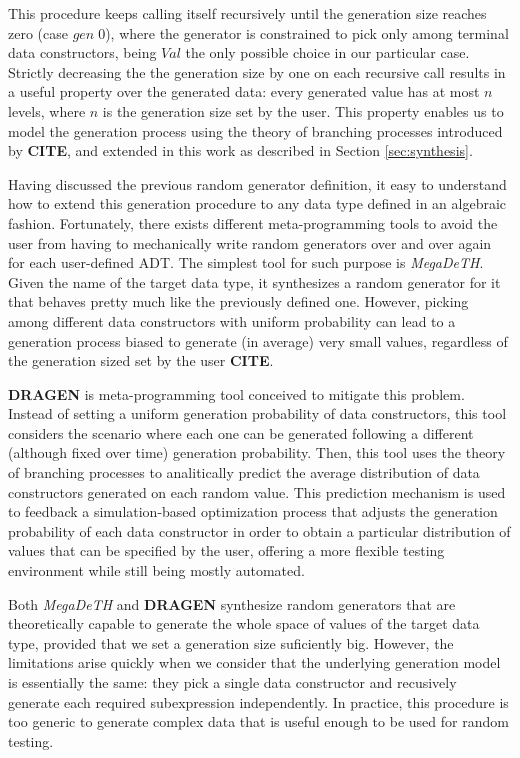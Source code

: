 \documentclass[conference, fleqn]{IEEEtran}
\newcommand{\Conid}[1]{\mathit{#1}}
\newcommand{\Varid}[1]{\mathit{#1}}
\newcommand{\tocite}{\textbf{CITE}}
\newcommand{\megadeth}{\emph{MegaDeTH}\xspace}
\newcommand{\dragen}{\textbf{DRAGEN}\xspace}
\begin{document}
This procedure keeps calling itself recursively until the generation size
reaches zero (case \ensuremath{\Varid{gen}\;\mathrm{0}}), where the generator is constrained to pick only
among terminal data constructors, being \ensuremath{\Conid{Val}} the only possible choice in our
particular case.
%
Strictly decreasing the the generation size by one on each recursive call
results in a useful property over the generated data: every generated value has
at most \ensuremath{\Varid{n}} levels, where \ensuremath{\Varid{n}} is the generation size set by the user.
%
This property enables us to model the generation process using the theory of
branching processes introduced by \tocite, and extended in this work as
described in Section \ref{sec:synthesis}.


Having discussed the previous random generator definition, it easy to understand
how to extend this generation procedure to any data type defined in an algebraic
fashion.
%
Fortunately, there exists different meta-programming tools to avoid the user
from having to mechanically write random generators over and over again for each
user-defined ADT.
%
The simplest tool for such purpose is \megadeth.
%
Given the name of the target data type, it synthesizes a random generator for it
that behaves pretty much like the previously defined one.
%
However, picking among different data constructors with uniform probability can
lead to a generation process biased to generate (in average) very small values,
regardless of the generation sized set by the user \tocite.

\dragen is meta-programming tool conceived to mitigate this problem.
%
Instead of setting a uniform generation probability of data constructors, this
tool considers the scenario where each one can be generated following a
different (although fixed over time) generation probability.
%
Then, this tool uses the theory of branching processes to analitically predict
the average distribution of data constructors generated on each random value.
%
This prediction mechanism is used to feedback a simulation-based optimization
process that adjusts the generation probability of each data constructor in
order to obtain a particular distribution of values that can be specified by the
user, offering a more flexible testing environment while still being mostly
automated.


Both \megadeth and \dragen synthesize random generators that are theoretically
capable to generate the whole space of values of the target data type, provided
that we set a generation size suficiently big.
%
However, the limitations arise quickly when we consider that the underlying
generation model is essentially the same: they pick a single data constructor
and recusively generate each required subexpression independently.
%
In practice, this procedure is too generic to generate complex data that is
useful enough to be used for random testing.
\end{document}

